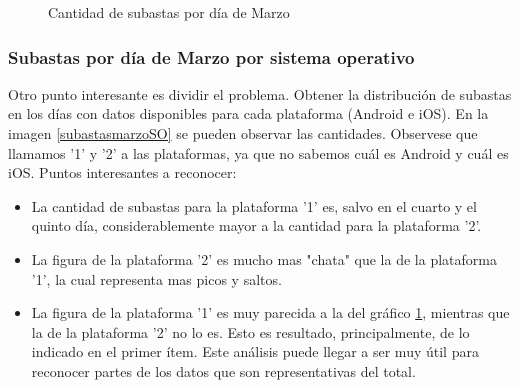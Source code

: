 \documentclass[a4paper, 12pt]{article}
\newcommand\tab[1][1cm]{\hspace*{#1}}
\begin{document}
	\FloatBarrier
		\begin{figure}
			\centering
		   		\caption{Cantidad de subastas por día de Marzo}
			   	\label{subastasmarzo}
		\end{figure}
	\FloatBarrier

	\subsubsection{Subastas por día de Marzo por sistema operativo}
	\tab Otro punto interesante es dividir el problema. Obtener la distribución de subastas en los días con datos disponibles para cada plataforma (Android e iOS). En la imagen \ref{subastasmarzoSO} se pueden observar las cantidades. Observese que llamamos '1' y '2' a las plataformas, ya que no sabemos cuál es Android y cuál es iOS.
	\tab Puntos interesantes a reconocer:

	\begin{itemize}
		\item La cantidad de subastas para la plataforma '1' es, salvo en el cuarto y el quinto día, considerablemente mayor a la cantidad para la plataforma '2'.
		\item La figura de la plataforma '2' es mucho mas "chata" que la de la plataforma '1', la cual representa mas picos y saltos.
		\item La figura de la plataforma '1' es muy parecida a la del gráfico \ref{subastasmarzo}, mientras que la de la plataforma '2' no lo es. Esto es resultado, principalmente, de lo indicado en el primer ítem. Este análisis puede llegar a ser muy útil para reconocer partes de los datos que son representativas del total.
	\end{itemize}
\end{document}
